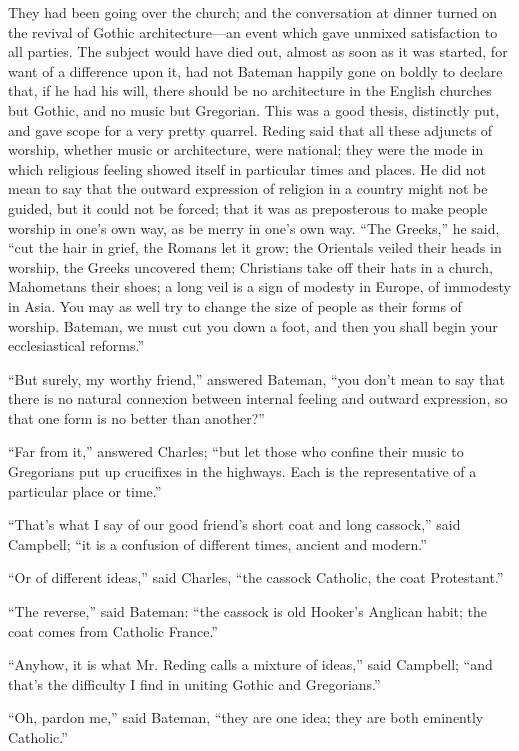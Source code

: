They had been going over the church; and the conversation at dinner
turned on the revival of Gothic architecture—an event which gave
unmixed satisfaction to all parties. The subject would have died out,
almost as soon as it was started, for want of a difference upon it,
had not Bateman happily gone on boldly to declare that, if he had his
will, there should be no architecture in the English churches
but Gothic, and no music but Gregorian. This was a good thesis,
distinctly put, and gave scope for a very pretty quarrel. Reding said
that all these adjuncts of worship, whether music or architecture,
were national; they were the mode in which religious feeling showed
itself in particular times and places. He did not mean to say that the
outward expression of religion in a country might not be guided, but
it could not be forced; that it was as preposterous to make people
worship in one's own way, as be merry in one's own way. ``The
Greeks,'' he said, ``cut the hair in grief, the Romans let it
grow; the Orientals veiled their heads in worship, the Greeks
uncovered them; Christians take off their hats in a church, Mahometans
their shoes; a long veil is a sign of modesty in Europe, of immodesty
in Asia. You may as well try to change the size of people as their
forms of worship. Bateman, we must cut you down a foot, and then you
shall begin your ecclesiastical reforms.''

``But surely, my worthy friend,'' answered Bateman,
``you don't mean to say that there is no natural connexion between
internal feeling and outward expression, so that one form is no better
than another?''

``Far from it,'' answered Charles; ``but let those who
confine their music to Gregorians put up crucifixes in the highways.
Each is the representative of a particular place or time.''

``That's what I say of our good friend's short coat and long
cassock,'' said Campbell; ``it is a confusion of different
times, ancient and modern.''

``Or of different ideas,'' said Charles, ``the cassock
Catholic, the coat Protestant.''

``The reverse,'' said Bateman: ``the cassock is old
Hooker's Anglican habit; the coat comes from Catholic France.''

``Anyhow, it is what Mr. Reding calls a mixture of ideas,''
said Campbell; ``and that's the difficulty I find in uniting
Gothic and Gregorians.''

``Oh, pardon me,'' said Bateman, ``they are one idea;
they are both eminently Catholic.''

